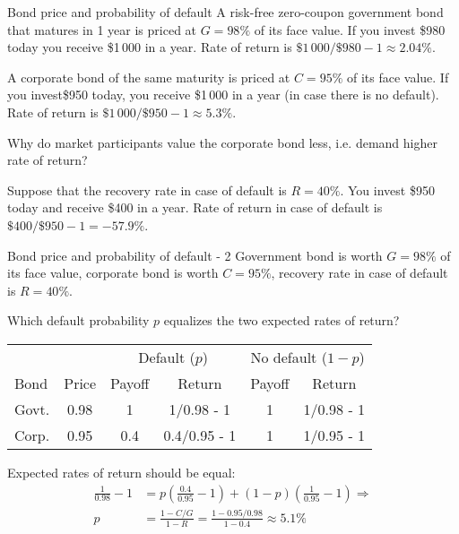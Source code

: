 \documentclass{beamer}
\begin{document}
\begin{frame}{Bond price and probability of default}
\justify
A risk-free zero-coupon government bond that matures in 1 year is priced at $G=98\%$ of its face value. If you invest \$980 today you receive \$1\,000 in a year. Rate of return is $\$1\,000 / \$980 - 1 \approx 2.04\%$.

\justify
A corporate bond of the same maturity is priced at $C=95\%$ of its face value. If you invest\$950 today, you receive \$1\,000 in a year (in case there is no default). Rate of return is $\$1\,000 / \$950 - 1 \approx 5.3\%$.

\justify
Why do market participants value the corporate bond less, i.e. demand higher rate of return?

\justify
Suppose that the recovery rate in case of default is $R=40\%$. You invest \$950 today and receive \$400 in a year. Rate of return in case of default is $\$400 / \$950 - 1 = -57.9\%$.
\end{frame}



\begin{frame}{Bond price and probability of default - 2}
\justify
Government bond is worth $G=98\%$ of its face value, corporate bond is worth $C=95\%$, recovery rate in case of default is $R=40\%$.

\justify
Which default probability $p$ equalizes the two expected rates of return?

\justify
\centering
\begin{tabular}{l|c|c|c|c|c}
& & \multicolumn{2}{c|}{Default ($p$)} & \multicolumn{2}{c}{No default ($1-p$)} \\
Bond & Price & Payoff & Return & Payoff & Return \\
\hline
Govt.  & 0.98 & 1     & 1/0.98 - 1 & 1 & 1/0.98 - 1\\
Corp. & 0.95 & 0.4 & 0.4/0.95 - 1 & 1 & 1/0.95 - 1
\end{tabular}

\justify
Expected rates of return should be equal:
\begin{align*}
\frac{1}{0.98} - 1 &= p\left(\frac{0.4}{0.95} - 1\right) + (1-p)\left(\frac{1}{0.95} - 1\right) \Rightarrow \\
p &= \frac{1 - C/G}{1-R} = \frac{1 - 0.95/0.98}{1-0.4} \approx 5.1\%
\end{align*}
\end{frame}
\end{document}
